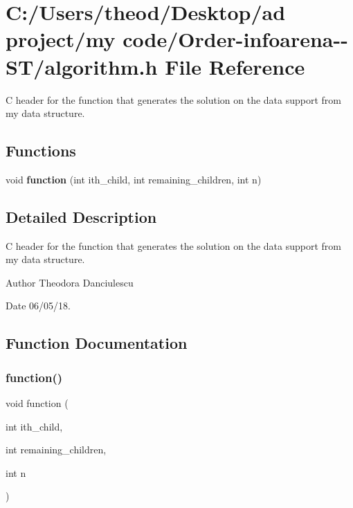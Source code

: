 \section{C\+:/\+Users/theod/\+Desktop/ad project/my code/\+Order-\/infoarena-\/-\/\+S\+T/algorithm.h File Reference}
\label{algorithm_8h}


C header for the function that generates the solution on the data support from my data structure.  


\subsection*{Functions}
\begin{DoxyCompactItemize}
\item 
void \textbf{ function} (int ith\+\_\+child, int remaining\+\_\+children, int n)
\end{DoxyCompactItemize}


\subsection{Detailed Description}
C header for the function that generates the solution on the data support from my data structure. 

\begin{DoxyAuthor}{Author}
Theodora Danciulescu 
\end{DoxyAuthor}
\begin{DoxyDate}{Date}
06/05/18. 
\end{DoxyDate}


\subsection{Function Documentation}
\mbox{\label{algorithm_8h_ad1b279f41eec5d28d989bd73692c4efb}} 
\subsubsection{function()}
{\footnotesize\ttfamily void function (\begin{DoxyParamCaption}\item[{int}]{ith\+\_\+child,  }\item[{int}]{remaining\+\_\+children,  }\item[{int}]{n }\end{DoxyParamCaption})}

